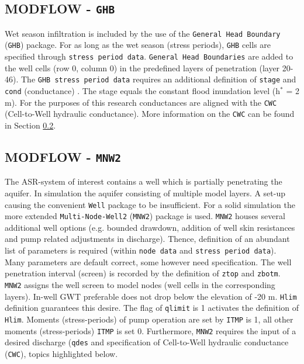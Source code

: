 \subsection{MODFLOW - \texttt{GHB}}
Wet season infiltration is included by the use of the \texttt{General Head Boundary} (\texttt{GHB}) package. For as long as the wet season (stress periods), \texttt{GHB} cells are specified through \texttt{stress period data}. \texttt{General Head Boundaries} are added to the well cells (row 0, column 0) in the predefined layers of penetration (layer 20-46). The \texttt{GHB stress period data} requires an additional definition of \texttt{stage} and \texttt{cond} (conductance) \citep{Harbaugh2000}. The stage equals the constant flood inundation level (h$^*$ = 2 m). For the purposes of this research conductances are aligned with the \texttt{CWC} (Cell-to-Well hydraulic conductance). More information on the \texttt{CWC} can be found in Section \ref{subsec:MODFLOW_MNW2}. 

\subsection{MODFLOW - \texttt{MNW2}}
\label{subsec:MODFLOW_MNW2}
The ASR-system of interest contains a well which is partially penetrating the aquifer. In simulation the aquifer consisting of multiple model layers. A set-up causing the convenient \texttt{Well} package to be insufficient. For a solid simulation the more extended \texttt{Multi-Node-Well2} (\texttt{MNW2}) package is used. \texttt{MNW2} houses several additional well options (e.g. bounded drawdown, addition of well skin resistances and pump related adjustments in discharge). Thence, definition of an abundant list of parameters is required (within \texttt{node data} and \texttt{stress period data})\citep{LeonardF.KonikowGeorgeZ.HornbergerKeithJ.Halford2009}.  \\

Many parameters are default correct, some however need specification. The well penetration interval (screen) is recorded by the definition of \texttt{ztop} and \texttt{zbotm}. \texttt{MNW2} assigns the well screen to model nodes (well cells in the corresponding layers). In-well GWT preferable does not drop below the elevation of -20 m. \texttt{Hlim} definition guarantees this desire. The flag of \texttt{qlimit} is 1 activates the definition of \texttt{Hlim}. Moments (stress-periods) of pump operation are set by \texttt{ITMP} is 1, all other moments (stress-periods) \texttt{ITMP} is set 0. Furthermore, \texttt{MNW2} requires the input of a desired discharge (\texttt{qdes} and specification of Cell-to-Well hydraulic conductance (\texttt{CWC}), topics highlighted below. \\

